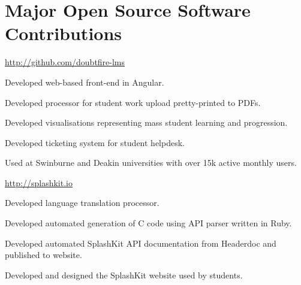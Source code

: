 \section{Major Open Source Software Contributions}

\begin{multicols}{2}

{}
{
}
{\href{http://github.com/doubtfire-lms}{http://github.com/doubtfire-lms}}
{
  \item Developed web-based front-end in Angular.
  \item Developed processor for student work upload pretty-printed to PDFs.
  \item Developed visualisations representing mass student learning and progression.
  \item Developed ticketing system for student helpdesk.
  \item Used at Swinburne and Deakin universities with over 15k active monthly users.
}

\columnbreak

{}
{
}
{\href{http://splashkit.io}{http://splashkit.io}}
{
  \item Developed language translation processor.
  \item Developed automated generation of C code using API parser written in Ruby.
  \item Developed automated SplashKit API documentation from Headerdoc and published to website.
  \item Developed and designed the SplashKit website used by students.
}

\end{multicols}